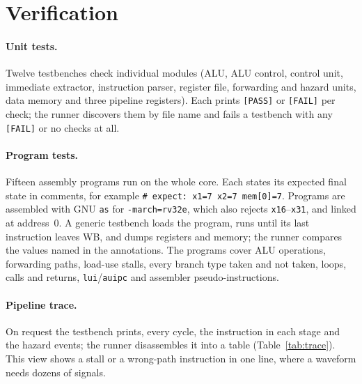 \documentclass[12pt]{article}
\begin{document}
\section{Verification}

\paragraph{Unit tests.}
Twelve testbenches check individual modules (ALU, ALU control, control unit,
immediate extractor, instruction parser, register file, forwarding and hazard
units, data memory and three pipeline registers). Each prints \texttt{[PASS]} or
\texttt{[FAIL]} per check; the runner discovers them by file name and fails a
testbench with any \texttt{[FAIL]} or no checks at all.

\paragraph{Program tests.}
Fifteen assembly programs run on the whole core. Each states its expected final
state in comments, for example \texttt{\# expect: x1=7 x2=7 mem[0]=7}. Programs
are assembled with GNU \texttt{as} for \texttt{-march=rv32e}, which also rejects
\texttt{x16}--\texttt{x31}, and linked at address~0. A generic testbench loads
the program, runs until its last instruction leaves WB, and dumps registers and
memory; the runner compares the values named in the annotations. The programs
cover ALU operations, forwarding paths, load-use stalls, every branch type taken
and not taken, loops, calls and returns, \texttt{lui}/\texttt{auipc} and
assembler pseudo-instructions.

\paragraph{Pipeline trace.}
On request the testbench prints, every cycle, the instruction in each stage and
the hazard events; the runner disassembles it into a table
(Table~\ref{tab:trace}). This view shows a stall or a wrong-path instruction in
one line, where a waveform needs dozens of signals.
\end{document}
